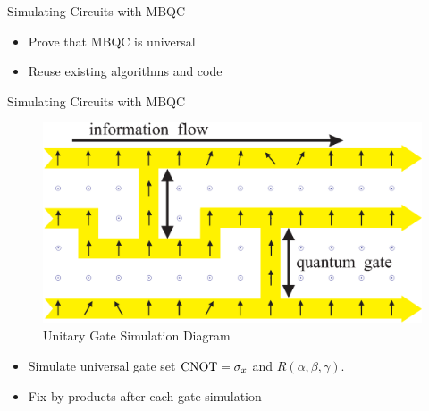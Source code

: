 \begin{frame}{Simulating Circuits with MBQC}
        \begin{itemize}
            \item Prove that MBQC is universal
            \item Reuse existing algorithms and code
        \end{itemize}
\end{frame}

\begin{frame}{Simulating Circuits with MBQC}
        \begin{figure}
            \centering
            \includegraphics[scale=0.35]{fig/flow.eps}
            \caption{Unitary Gate Simulation Diagram}
        \end{figure}
        \begin{itemize}
            \item Simulate universal gate set \(\operatorname{CNOT}=\sigma_x\) and \(R(\alpha, \beta, \gamma)\).
            \item Fix by products after each gate simulation
        \end{itemize}
\end{frame}

